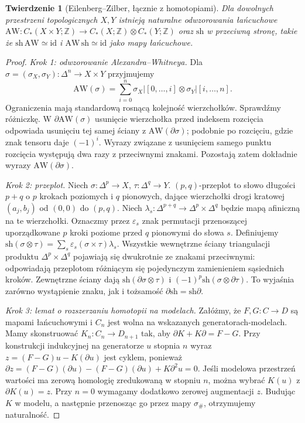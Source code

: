 \documentclass[11pt,a4paper,oneside]{report}
\newcommand{\Z}{\mathbb{Z}}
\newcommand{\id}{\mathrm{id}}
\theoremstyle{plain}
\newtheorem{twierdzenie}{Twierdzenie}[section]
\theoremstyle{definition}
\theoremstyle{remark}
\begin{document}
\begin{twierdzenie}[Eilenberg--Zilber, łącznie z homotopiami]
\label{thm:ez-v4}
Dla dowolnych przestrzeni topologicznych $X,Y$ istnieją naturalne
odwzorowania łańcuchowe
$\mathrm{AW}:C_*(X\times Y;\Z)\to C_*(X;\Z)\otimes C_*(Y;\Z)$
oraz $\mathrm{sh}$ w przeciwną stronę, takie że
$\mathrm{sh}\,\mathrm{AW}\simeq\id$ i
$\mathrm{AW}\,\mathrm{sh}\simeq\id$ jako mapy łańcuchowe.
\end{twierdzenie}
\begin{proof}
\emph{Krok 1: odwzorowanie Alexandra--Whitneya.}
Dla $\sigma=(\sigma_X,\sigma_Y):\Delta^n\to X\times Y$
przyjmujemy
\[
\mathrm{AW}(\sigma)=\sum_{i=0}^n
\sigma_X|[0,\ldots,i]\otimes\sigma_Y|[i,\ldots,n].
\]
Ograniczenia mają standardową rosnącą kolejność wierzchołków.
Sprawdźmy różniczkę. W $\partial\mathrm{AW}(\sigma)$
usunięcie wierzchołka przed indeksem rozcięcia odpowiada
usunięciu tej samej ściany z $\mathrm{AW}(\partial\sigma)$;
podobnie po rozcięciu, gdzie znak tensoru daje $(-1)^i$.
Wyrazy związane z usunięciem samego punktu rozcięcia
występują dwa razy z przeciwnymi znakami. Pozostają zatem
dokładnie wyrazy $\mathrm{AW}(\partial\sigma)$.

\emph{Krok 2: przeplot.}
Niech $\sigma:\Delta^p\to X$, $\tau:\Delta^q\to Y$.
$(p,q)$-przeplot to słowo długości $p+q$ o $p$ krokach
poziomych i $q$ pionowych, dające wierzchołki drogi kratowej
$(a_j,b_j)$ od $(0,0)$ do $(p,q)$. Niech
$\lambda_s:\Delta^{p+q}\to\Delta^p\times\Delta^q$
będzie mapą afiniczną na te wierzchołki. Oznaczmy przez
$\varepsilon_s$ znak permutacji przenoszącej uporządkowane
$p$ kroki poziome przed $q$ pionowymi do słowa $s$.
Definiujemy
$\mathrm{sh}(\sigma\otimes\tau)
=\sum_s\varepsilon_s(\sigma\times\tau)\lambda_s$.
Wszystkie wewnętrzne ściany triangulacji produktu
$\Delta^p\times\Delta^q$ pojawiają się dwukrotnie ze znakami
przeciwnymi: odpowiadają przeplotom różniącym się pojedynczym
zamienieniem sąsiednich kroków. Zewnętrzne ściany dają
$\mathrm{sh}(\partial\sigma\otimes\tau)$ i
$(-1)^p\mathrm{sh}(\sigma\otimes\partial\tau)$.
To wyjaśnia zarówno wystąpienie znaku, jak i tożsamość
$\partial\mathrm{sh}=\mathrm{sh}\partial$.

\emph{Krok 3: lemat o rozszerzaniu homotopii na modelach.}
Załóżmy, że $F,G:C\to D$ są mapami łańcuchowymi i $C_n$
jest wolna na wskazanych generatorach-modelach. Mamy skonstruować
$K_n:C_n\to D_{n+1}$ tak, aby $\partial K+K\partial=F-G$.
Przy konstrukcji indukcyjnej na generatorze $u$ stopnia $n$
wyraz $z=(F-G)u-K(\partial u)$ jest cyklem, ponieważ
$\partial z=(F-G)(\partial u)-(F-G)(\partial u)+K\partial^2u=0$.
Jeśli modelowa przestrzeń wartości ma zerową homologię
zredukowaną w stopniu $n$, można wybrać $K(u)$ z
$\partial K(u)=z$. Przy $n=0$ wymagamy dodatkowo zerowej
augmentacji $z$. Budując $K$ w modelu, a następnie
przenosząc go przez mapy $\sigma_\#$, otrzymujemy naturalność.


\end{proof}
\end{document}
